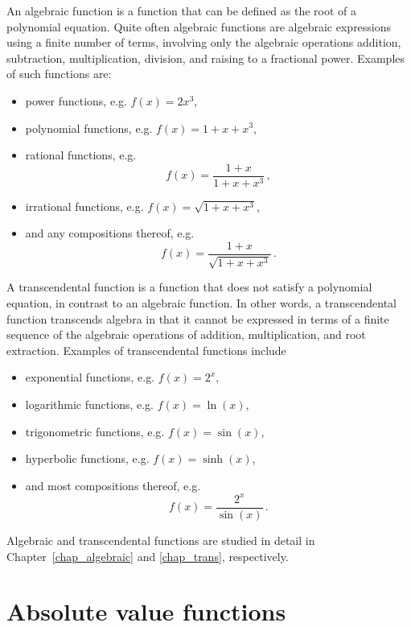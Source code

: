 An algebraic function is a function that can be defined as the root of a polynomial equation. Quite often algebraic functions are algebraic expressions using a finite number of terms, involving only the algebraic operations addition, subtraction, multiplication, division, and raising to a fractional power. Examples of such functions are:
\begin{itemize}
\item power functions, e.g. $f(x)=2x^3$,
\item polynomial functions, e.g. $f(x)=1+x+x^3$,
\item rational functions, e.g.
$$
f(x)=\dfrac{1+x}{1+x+x^3}\,,
$$
\item irrational functions, e.g. $f(x)=\sqrt{1+x+x^3}$, 
\item and any compositions thereof, e.g.
$$
f(x)=\dfrac{1+x}{\sqrt{1+x+x^3}}\,.
$$
\end{itemize}

A transcendental function is a function that does not satisfy a polynomial equation, in contrast to an algebraic function. In other words, a transcendental function transcends algebra in that it cannot be expressed in terms of a finite sequence of the algebraic operations of addition, multiplication, and root extraction. Examples of transcendental functions include
\begin{itemize} 
\item exponential functions, e.g. $f(x)=2^x$,
\item logarithmic functions, e.g. $f(x)=\ln(x)$,
\item trigonometric functions, e.g. $f(x)=\sin(x)$,
\ifcourse 

 \item hyperbolic functions, e.g. $f(x)=\sinh(x)$,
 
 \fi
\item and most compositions thereof, e.g.
$$
f(x)=\dfrac{2^x}{\sin(x)}\,.
$$
\end{itemize}

Algebraic and transcendental functions are studied in detail in Chapter~\ref{chap_algebraic} and \ref{chap_trans}, respectively. 




\section{Absolute value functions}\label{abs_functies}
